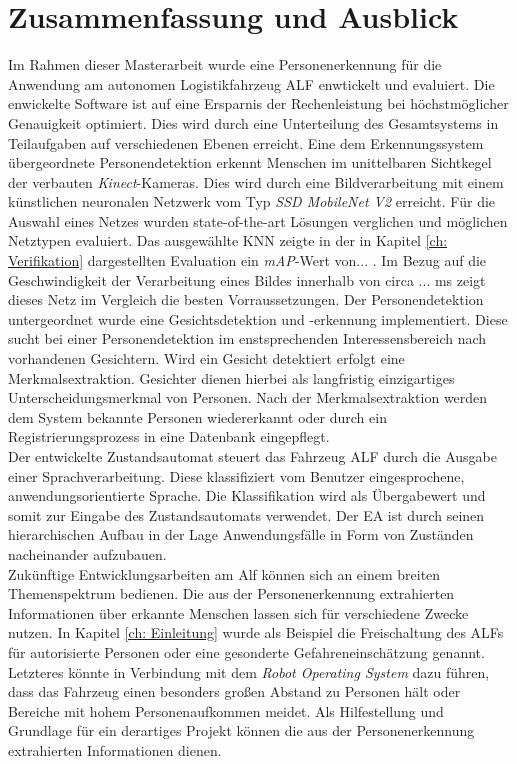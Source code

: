 \chapter{Zusammenfassung und Ausblick}
\label{Fazit und Ausblick}
	
Im Rahmen dieser Masterarbeit wurde eine Personenerkennung für die Anwendung am autonomen Logistikfahrzeug ALF enwtickelt und evaluiert. Die enwickelte Software ist auf eine Ersparnis der Rechenleistung bei höchstmöglicher Genauigkeit optimiert. Dies wird durch eine Unterteilung des Gesamtsystems in Teilaufgaben auf verschiedenen Ebenen erreicht. Eine dem Erkennungssystem übergeordnete Personendetektion erkennt Menschen im unittelbaren Sichtkegel der verbauten \textit{Kinect}-Kameras. Dies wird durch eine Bildverarbeitung mit einem künstlichen neuronalen Netzwerk vom Typ \textit{SSD MobileNet V2} erreicht. Für die Auswahl eines Netzes wurden state-of-the-art Lösungen verglichen und möglichen Netztypen evaluiert. Das ausgewählte KNN zeigte in der in Kapitel \ref{ch: Verifikation} dargestellten Evaluation ein \textit{mAP}-Wert von... . Im Bezug auf die Geschwindigkeit der Verarbeitung eines Bildes innerhalb von circa ... ms zeigt dieses Netz im Vergleich die besten Vorraussetzungen. Der Personendetektion untergeordnet wurde eine Gesichtsdetektion und -erkennung implementiert. Diese sucht bei einer Personendetektion im enstsprechenden Interessensbereich nach vorhandenen Gesichtern. Wird ein Gesicht detektiert erfolgt eine Merkmalsextraktion. Gesichter dienen hierbei als langfristig einzigartiges Unterscheidungsmerkmal von Personen. Nach der Merkmalsextraktion werden dem System bekannte Personen wiedererkannt oder durch ein Registrierungsprozess in eine Datenbank eingepflegt.\\

Der entwickelte Zustandsautomat steuert das Fahrzeug ALF durch die Ausgabe einer Sprachverarbeitung. Diese klassifiziert vom Benutzer eingesprochene, anwendungsorientierte Sprache. Die Klassifikation wird als Übergabewert und somit zur Eingabe des Zustandsautomats verwendet. Der EA ist durch seinen hierarchischen Aufbau in der Lage Anwendungsfälle in Form von Zuständen nacheinander aufzubauen.\\


Zukünftige Entwicklungsarbeiten am Alf können sich an einem breiten Themenspektrum bedienen. Die aus der Personenerkennung extrahierten Informationen über erkannte Menschen lassen sich für verschiedene Zwecke nutzen. In Kapitel \ref{ch: Einleitung} wurde als Beispiel die Freischaltung des ALFs für autorisierte Personen oder eine gesonderte Gefahreneinschätzung genannt. Letzteres könnte in Verbindung mit dem \textit{Robot Operating System} dazu führen, dass das Fahrzeug einen besonders großen Abstand zu Personen hält oder Bereiche mit hohem Personenaufkommen meidet. Als Hilfestellung und Grundlage für ein derartiges Projekt können die aus der Personenerkennung extrahierten Informationen dienen. \\

